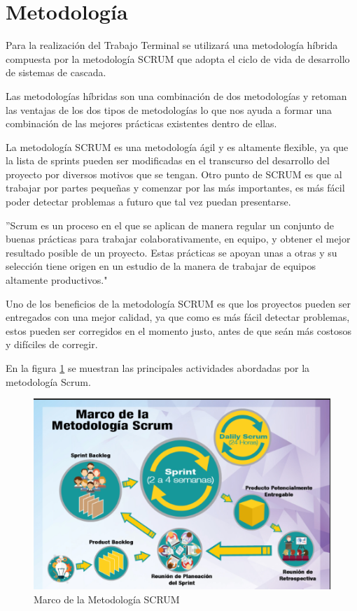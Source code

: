 \newpage
\section{Metodología}
Para la realización del Trabajo Terminal se utilizará una metodología híbrida compuesta por la metodología SCRUM que adopta el ciclo de vida de desarrollo de sistemas de cascada.

Las metodologías híbridas son una combinación de dos metodologías y retoman las ventajas de los dos tipos de metodologías lo que nos ayuda a formar una combinación de las mejores prácticas existentes dentro de ellas.

La metodología SCRUM es una metodología ágil y es altamente flexible, ya que la lista de sprints pueden ser modificadas en el transcurso del desarrollo del proyecto por diversos motivos que se tengan. Otro punto de SCRUM es que al trabajar por partes pequeñas y comenzar por las más importantes, es más fácil poder detectar problemas a futuro que tal vez puedan presentarse\cite{Referencia17}.

''Scrum es un proceso en el que se aplican de manera regular un conjunto de buenas prácticas para trabajar colaborativamente, en equipo, y obtener el mejor resultado posible de un proyecto. Estas prácticas se apoyan unas a otras y su selección tiene origen en un estudio de la manera de trabajar de equipos altamente productivos."\cite{Referencia18}

Uno de los beneficios de la metodología SCRUM es que los proyectos pueden ser entregados con una mejor calidad, ya que como es más fácil detectar problemas, estos pueden ser corregidos en el momento justo, antes de que seán más costosos y difíciles de corregir. 

En la figura \ref{fig:metodologiaSCRUM} se muestran las principales actividades abordadas por la metodología Scrum.
\newpage
\begin{figure}[htb]
	\centering
	\includegraphics[width=1\textwidth]{images/introduccion/scrum}
	\caption{Marco de la Metodología SCRUM} \label{fig:metodologiaSCRUM}
\end{figure}

